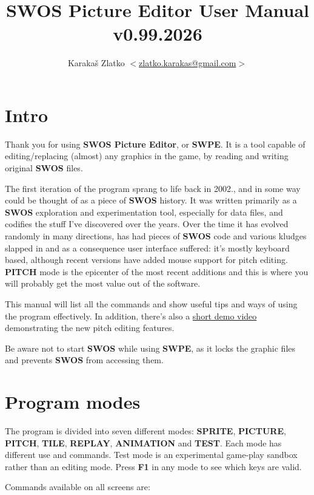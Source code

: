 \documentclass[a4paper,12pt]{article}
\author{Karaka\v s Zlatko $<$\href{mailto:zlatko.karakas@gmail.com}{zlatko.karakas@gmail.com}$>$}
\title{{\bf SWOS Picture Editor User Manual}\\v0.99.2026}
\begin{document}
\maketitle

\section{Intro}
Thank you for using {\bf SWOS Picture Editor}, or {\bf SWPE}. It is a tool capable of editing/replacing (almost) any graphics in the game, by reading and writing original {\bf SWOS} files.

The first iteration of the program sprang to life back in 2002., and in some way could be thought of as a piece of {\bf SWOS} history. It was written primarily as a {\bf SWOS} exploration and experimentation tool, especially for data files, and codifies the stuff I've discovered over the years. Over the time it has evolved randomly in many directions, has had pieces of {\bf SWOS} code and various kludges slapped in and as a consequence user interface suffered: it's mostly keyboard based, although recent versions have added mouse support for pitch editing. {\bf PITCH} mode is the epicenter of the most recent additions and this is where you will probably get the most value out of the software.


This manual will list all the commands and show useful tips and ways of using the program effectively. In addition, there's also a \href{https://youtu.be/MOIL5FJbcWQ}{short demo video} demonstrating the new pitch editing features.

Be aware not to start {\bf SWOS} while using {\bf SWPE}, as it locks the graphic files and prevents {\bf SWOS} from accessing them.

\newpage
\section{Program modes}

The program is divided into seven different modes: {\bf SPRITE}, {\bf PICTURE},
{\bf PITCH}, {\bf TILE}, {\bf REPLAY}, {\bf ANIMATION} and {\bf TEST}. Each
mode has different use and commands. Test mode is an experimental game-play
sandbox rather than an editing mode.
Press {\bf F1} in any mode to see which keys are valid.

\vspace{\baselineskip}

\noindent Commands available on all screens are:
\end{document}
